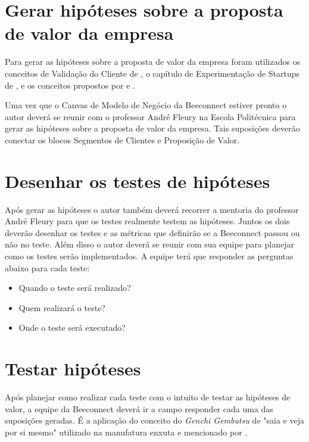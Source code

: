 \section{Gerar hipóteses sobre a proposta de valor da empresa}
\label{cha:gerar_hipoteses}
Para gerar as hipóteses sobre a proposta de valor da empresa foram utilizados os conceitos de Validação do Cliente de , o capítulo de Experimentação de Startups de , e os conceitos propostos por  e .    

Uma vez que o Canvas de Modelo de Negócio da Beeconnect estiver pronto o autor deverá se reunir com o professor André Fleury na Escola Politécnica para gerar as hipóteses sobre a proposta de valor da empresa. Tais suposições deverão conectar os blocos Segmentos de Clientes e Proposição de Valor.

\section{Desenhar os testes de hipóteses}
\label{cha:desenhar_hipoteses}
Após gerar as hipóteses o autor também deverá recorrer a mentoria do professor André Fleury para que os testes realmente testem as hipóteses. Juntos os dois deverão desenhar os testes e as métricas que definirão se a Beeconnect passou ou não no teste. 
Além disso o autor deverá se reunir com sua equipe para planejar como os testes serão implementados. A equipe terá que responder as perguntas abaixo para cada teste:
\begin{itemize}
\item Quando o teste será realizado?
\item Quem realizará o teste?
\item Onde o teste será executado?
\end{itemize}

\section{Testar hipóteses}
\label{cha:testar_hipoteses}
Após planejar como realizar cada teste com o intuito de testar as hipóteses de valor, a equipe da Beeconnect deverá ir a campo responder cada uma das suposições geradas. É a aplicação do conceito do \textit{Genchi Gembutsu} de "saia e veja por si mesmo" utilizado na manufatura enxuta e mencionado por .


